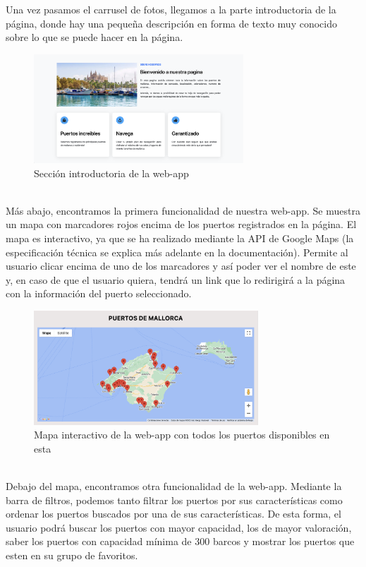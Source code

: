 \documentclass{article}
\begin{document}
\noindent Una vez pasamos el carrusel de fotos, llegamos a la parte introductoria de la página, donde hay una pequeña descripción en forma de texto muy conocido sobre lo que se puede hacer en la página.
\begin{figure}[ht]
    \centering
    \includegraphics[width=0.7\textwidth]{images/introduccion.png}
    \caption{Sección introductoria de la web-app}
\end{figure}
\\Más abajo, encontramos la primera funcionalidad de nuestra web-app. Se muestra un mapa con marcadores rojos encima de los puertos registrados en la página. El mapa es interactivo, ya que se ha realizado mediante la API de Google Maps (la especificación técnica se explica más adelante en la documentación). Permite al usuario clicar encima de uno de los marcadores y así poder ver el nombre de este y, en caso de que el usuario quiera, tendrá un link que lo redirigirá a la página con la información del puerto seleccionado.
\begin{figure}[ht]
    \centering
    \includegraphics[width=0.75\textwidth]{images/mapa.png}
    \caption{Mapa interactivo de la web-app con todos los puertos disponibles en esta}
\end{figure}
\\Debajo del mapa, encontramos otra funcionalidad de la web-app. Mediante la barra de filtros, podemos tanto filtrar los puertos por sus características como ordenar los puertos buscados por una de sus características. De esta forma, el usuario podrá buscar los puertos con mayor capacidad, los de mayor valoración, saber los puertos con capacidad mínima de 300 barcos y mostrar los puertos que esten en su grupo de favoritos.\\
\end{document}
